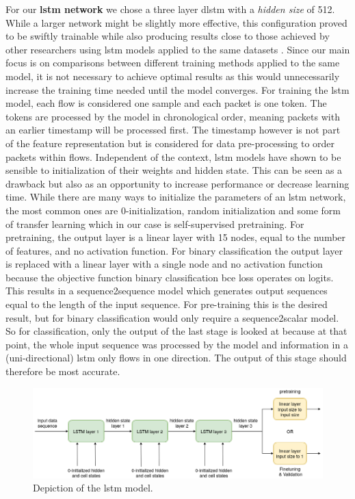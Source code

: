 For our \textbf{\gls{lstm} network} we chose a three layer \gls{dlstm} with a \textit{hidden size} of 512. While a larger network might be slightly more effective, this configuration proved to be swiftly trainable while also producing results close to those achieved by other researchers using \gls{lstm} models applied to the same datasets \cite{fog_based_detection_survey_2020}. Since our main focus is on comparisons between different training methods applied to the same model, it is not necessary to achieve optimal results as this would unnecessarily increase the training time needed until the model converges. For training the \gls{lstm} model, each flow is considered one sample and each packet is one token. The tokens are processed by the model in chronological order, meaning packets with an earlier timestamp will be processed first. The timestamp however is not part of the feature representation but is considered for data pre-processing to order packets within flows. Independent of the context, \gls{lstm} models have shown to be sensible to initialization of their weights and hidden state. This can be seen as a drawback but also as an opportunity to increase performance or decrease learning time. While there are many ways to initialize the parameters of an \gls{lstm} network, the most common ones are 0-initialization, random initialization and some form of transfer learning which in our case is self-supervised pretraining. For pretraining, the output layer is a linear layer with 15 nodes, equal to the number of features, and no activation function. For binary classification the output layer is replaced with a linear layer with a single node and no activation function because the objective function binary classification \gls{bce} loss operates on logits. This results in a sequence2sequence model which generates output sequences equal to the length of the input sequence. For pre-training this is the desired result, but for binary classification would only require a sequence2scalar model. So for classification, only the output of the last stage is looked at because at that point, the whole input sequence was processed by the model and information in a (uni-directional) \gls{lstm} only flows in one direction. The output of this stage should therefore be most accurate.

\begin{figure}[h]
	\centering
	\includegraphics[width=0.95\linewidth]{graphics/img/lstm_model.png}
	\caption{Depiction of the \gls{lstm} model.}
	\label{fig:lstm_model}
\end{figure}

